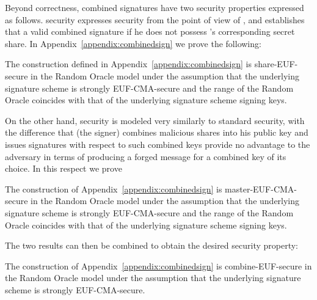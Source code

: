   Beyond correctness, combined signatures have two security properties expressed
  as follows.  security expresses security from the
  point of view of \alice{}, and establishes that \bob{}  a
  valid combined signature if he does not possess \alice's corresponding secret
  share. In Appendix~\ref{appendix:combinedsign} we prove the following:

  \begin{lemma}
    \label{lemma:comb:share}
    The construction defined in Appendix~\ref{appendix:combinedsign} is
    \textsf{share-EUF}-secure in the Random Oracle model under the assumption
    that the underlying signature scheme is strongly \textsf{EUF-CMA}-secure and
    the range of the Random Oracle coincides with that of the underlying
    signature scheme signing keys.
  \end{lemma}

  On the other hand,  security is modeled very
  similarly to standard  security, with the difference
  that \bob{} (the signer) combines malicious shares into his public key and
  issues signatures with respect to such combined keys provide no advantage to the adversary
  in terms of producing a forged message for a combined key of its choice. In
  this respect we prove\redden{:}

  \begin{lemma}
    \label{lemma:comb:master}
    The construction of Appendix~\ref{appendix:combinedsign} is
    \textsf{master-EUF-CMA}-secure in the Random Oracle model under the
    assumption that the underlying signature scheme is strongly
    \textsf{EUF-CMA}-secure and the range of the Random Oracle coincides with
    that of the underlying signature scheme signing keys.
  \end{lemma}

  The two results can then be combined to obtain the desired security property:

  \begin{theorem}
    \label{thm:combsign}
    The construction of Appendix~\ref{appendix:combinedsign} is
    \textsf{combine-EUF}-secure in the Random Oracle model under the assumption
    that the underlying signature scheme is strongly \textsf{EUF-CMA}-secure.
  \end{theorem}
